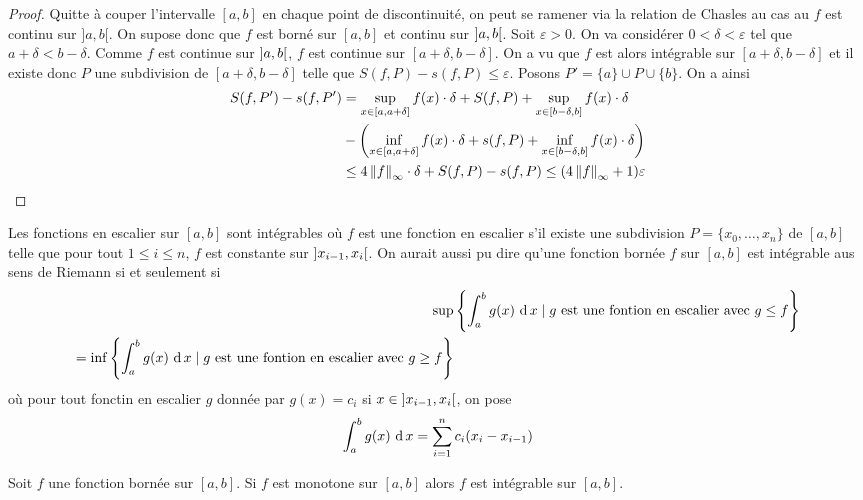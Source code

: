 \begin{proof}
    Quitte à couper l'intervalle $[a,b]$ en chaque point de discontinuité, on peut se ramener via la relation de Chasles au cas au $f$ est continu sur $]a,b[$. On supose donc que $f$ est borné sur $[a,b]$ et continu sur $\left] a,b\right[$. Soit $\varepsilon>0$. On va considérer $0<\delta < \varepsilon$ tel que $a+\delta < b-\delta$. Comme $f$ est continue sur $\left] a,b\right[$, $f$ est continue sur $[a+\delta, b-\delta]$. On a vu que $f$ est alors intégrable sur $[a+\delta, b-\delta]$ et il existe donc $P$ une subdivision de $[a+\delta, b-\delta]$ telle que $S(f,P)-s(f,P)\le\varepsilon$. Posons $P' = \{a\}\cup P\cup \{ b\}$. On a ainsi \begin{align*}
        S(f,P') - s(f,P') &= \sup_{x\in [a,a+\delta]}f(x)\cdot \delta  + S(f,P) + \sup_{x\in [b-\delta,b]}f(x)\cdot \delta \\
        &- \left(\inf_{x\in [a,a+\delta]}f(x)\cdot \delta  + s(f,P) + \inf_{x\in [b-\delta,b]}f(x)\cdot \delta \right)\\
        &\le 4\left\| f \right\|_{\infty}\cdot \delta + S(f,P)-s(f,P)\le (4\left\| f \right\|_{\infty} + 1)\varepsilon
    \end{align*}
\end{proof}
\begin{remarque}
    Les fonctions en escalier sur $[a,b]$ sont intégrables où $f$ est une fonction en escalier s'il existe une subdivision $P = \{ x_0,\ldots, x_n\}$ de $[a,b]$ telle que pour tout $1\le i \le n$, $f$ est constante sur $\left] x_{i-1}, x_i\right[$. On aurait aussi pu dire qu'une fonction bornée $f$ sur $[a,b]$ est intégrable aus sens de Riemann si et seulement si 
    \begin{align*}
        \sup&\left\{\int_a^bg(x)\,\operatorname{d} x \mid\text{$g$ est une fontion en escalier avec $g\le f$}\right\}\\
         = \inf\left\{\int_a^bg(x)\,\operatorname{d} x \mid\text{$g$ est une fontion en escalier avec $g\ge f$}\right\}
    \end{align*}
    où pour tout fonctin en escalier $g$ donnée par $g(x) = c_i$ si $x\in\left] x_{i-1},x_i\right[$, on pose $$\int_a^bg(x)\,\operatorname{d} x = \sum_{i = 1}^n c_i(x_i-x_{i-1})$$
\end{remarque}
\begin{proposition}
    Soit $f$ une fonction bornée sur $[a,b]$. Si $f$ est monotone sur $[a,b]$ alors $f$ est intégrable sur $[a,b]$.
\end{proposition}
